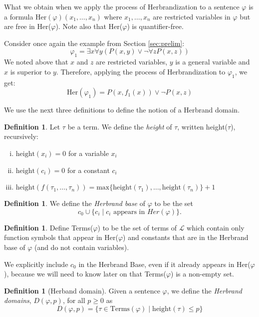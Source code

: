 \documentclass[a4paper,12pt]{report}
\theoremstyle{definition}
\newtheorem{mydef}[lem]{Definition}
\begin{document}
What we obtain when we apply the process of Herbrandization to a sentence $\varphi$ is a formula  $\mbox{Her}(\varphi)(x_1, \ldots , x_n)$ where $x_1, \ldots , x_n$  are restricted variables in $\varphi$ but are free in Her($\varphi$). Note also that Her($\varphi$) is quantifier-free.

Consider once again the example from Section \ref{sec:prelim}:
$$
\varphi_1 = \exists x \forall y (P(x,y) \lor \neg \forall z P(x,z))
$$
We noted above that $x$ and $z$ are restricted variables, $y$ is a general variable and $x$ is superior to $y$. Therefore, applying the process of Herbrandization to $\varphi_1$, we get:
$$
\mbox{Her}(\varphi_1) = P(x, f_1(x)) \lor \neg P(x, z)
$$

We use the next three definitions to define the notion of a Herbrand domain.

\begin{mydef}
\label{height}
Let $\tau$ be a term. We define the \emph{height} of $\tau$, written height($\tau$), recursively:
\begin{enumerate}[(i)]
\item $\mbox{height}(x_i) = 0$ for a variable $x_i$
\item $\mbox{height}(c_i) = 0$ for a constant $c_i$
\item $\mbox{height}(f(\tau_1, \ldots, \tau_n)) = \mbox{max} \{ \mbox{height} (\tau_1), \ldots, \mbox{height} (\tau_n) \} + 1$
\end{enumerate}
\end{mydef}

\begin{mydef}
\label{base}
We define the \emph{Herbrand base} of $\varphi$ to be the set 
$$
c_0 \cup \{ c_i \mid c_i \mbox{ appears in } Her(\varphi)\} .
$$
\end{mydef}

\begin{mydef}
Define Terms($\varphi$) to be the set of terms of $\mathcal{L}$ which contain only function symbols that appear in Her($\varphi$) and constants that are in the Herbrand base of $\varphi$ (and do not contain variables).
\end{mydef}

We explicitly include $c_0$ in the Herbrand Base, even if it already appears in Her($\varphi$), because we will need to know later on that Terms($\varphi$) is a non-empty set.

\begin{mydef}[Herband domain]
\label{herbdom}
Given a sentence $\varphi$, we define the \emph{Herbrand domains}, $D(\varphi, p)$, for all $p \ge 0$ as
$$
D(\varphi, p) = \{ \tau \in \mbox{Terms}(\varphi) \mid \mbox{height}(\tau) \le p \}
$$
\end{mydef}
\end{document}
